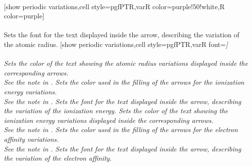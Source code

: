 \\ [5pt][show periodic variations,cell style=pgfPTR,varR color=purple!50!white,R color=purple]%
\\ [5pt]\makebox[\linewidth][c]{\scalebox{.6}{\pgfPT[show periodic variations,cell style=pgfPTR,varR color=purple!50!white, R color=purple]}}%
\\ [5pt]\pgfPTendoption%
\vfill%
%
{Sets the font for the text displayed inside the arrow, describing the variation of the atomic radius.}%
\vfill\newpage%
[show periodic variations,cell style=pgfPTR,varR font=\string\small\string\itshape]%
\\ [5pt]\makebox[\linewidth][c]{\scalebox{.6}{\pgfPT[show periodic variations,cell style=pgfPTR,varR font=\small\itshape]}}%
\\ [5pt]\pgfPTendoption%
%
{Sets the color of the text showing the atomic radius variations displayed inside the corresponding arrows.
\\ \textit{See the note in }.}%
%
{Sets the color used in the filling of the \textit{arrows} for the ionization energy variations.
\\ \textit{See the note in }.}%
%
{Sets the font for the text displayed inside the arrow, describing the variation of the ionization energy.}%
%
{Sets the color of the text showing the ionization energy variations displayed inside the corresponding arrows.
\\ \textit{See the note in }.}%
%
{Sets the color used in the filling of the \textit{arrows} for the electron affinity variations.
\\ \textit{See the note in }.}%
%
{Sets the font for the text displayed inside the arrow, describing the variation of the electron affinity.}%
